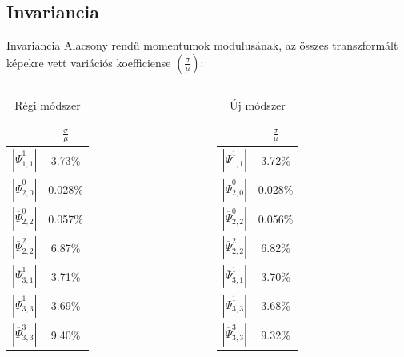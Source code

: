 \documentclass{beamer}
\begin{document}
\subsection{Invariancia}
\begin{frame}{Invariancia}
    \vskip 12mm
Alacsony rendű momentumok modulusának, az összes transzformált képekre vett variációs koefficiense $\left(\frac{\sigma}{\mu}\right)$:
\begin{columns}
    \begin{column}{.5\textwidth}
        \begin{table}
            \centering
        \begin{tabular}{| c | c | } \hline
        & $\frac{\sigma}{\mu}$ \\ \hline\hline
        $|\overline{\Psi}_{1,1}^1|$ & 3.73\% \\ \hline
        $|\overline{\Psi}_{2,0}^0|$ & 0.028\% \\ \hline
        $|\overline{\Psi}_{2,2}^0|$ & 0.057\% \\ \hline
        $|\overline{\Psi}_{2,2}^2|$ & 6.87\% \\ \hline
        $|\overline{\Psi}_{3,1}^1|$ & 3.71\%  \\ \hline
        $|\overline{\Psi}_{3,3}^1|$ & 3.69\% \\ \hline
        $|\overline{\Psi}_{3,3}^3|$ & 9.40\% \\ \hline
        \end{tabular}
        \caption*{Régi módszer}
        \end{table}
    \end{column}
    \begin{column}{.5\textwidth}
        \begin{table}
            \centering
        \begin{tabular}{| c | c | } \hline
        & $\frac{\sigma}{\mu}$ \\ \hline\hline
        $|\overline{\Psi}_{1,1}^1|$ & 3.72\% \\ \hline
        $|\overline{\Psi}_{2,0}^0|$ & 0.028\%\\ \hline
        $|\overline{\Psi}_{2,2}^0|$ & 0.056\%\\ \hline
        $|\overline{\Psi}_{2,2}^2|$ & 6.82\%\\ \hline
        $|\overline{\Psi}_{3,1}^1|$ & 3.70\%\\ \hline
        $|\overline{\Psi}_{3,3}^1|$ & 3.68\%\\ \hline
        $|\overline{\Psi}_{3,3}^3|$ & 9.32\%\\ \hline
        \end{tabular}
        \caption*{Új módszer}
        \end{table}
    \end{column}
\end{columns}
\end{frame}
\end{document}
